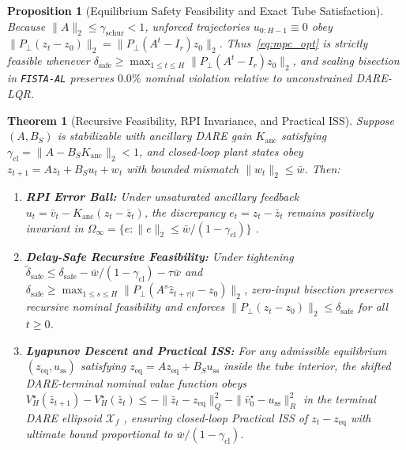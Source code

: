\documentclass[journal]{IEEEtran}
\newtheorem{theorem}{Theorem}
\newtheorem{proposition}{Proposition}
\begin{document}
\begin{proposition}[Equilibrium Safety Feasibility and Exact Tube Satisfaction]
\label{prop:mpc_safe}
Because $\|A\|_2 \le \gamma_{\mathrm{schur}} < 1$, unforced trajectories $u_{0:H-1} \equiv 0$ obey $\|P_\perp(z_t - z_0)\|_2 = \|P_\perp(A^t - I_r)z_0\|_2$. Thus~\eqref{eq:mpc_opt} is strictly feasible whenever $\delta_{\mathrm{safe}} \ge \max_{1\le t \le H}\|P_\perp(A^t - I_r)z_0\|_2$, and scaling bisection in \texttt{FISTA-AL} preserves $0.0\%$ nominal violation relative to unconstrained DARE-LQR.
\end{proposition}

\begin{theorem}[Recursive Feasibility, RPI Invariance, and Practical ISS]
\label{thm:tube_rpi}
Suppose $(A, B_S)$ is stabilizable with ancillary DARE gain $K_{\mathrm{anc}}$ satisfying $\gamma_{\mathrm{cl}} = \|A - B_S K_{\mathrm{anc}}\|_2 < 1$, and closed-loop plant states obey $z_{t+1} = A z_t + B_S u_t + w_t$ with bounded mismatch $\|w_t\|_2 \le \bar{w}$. Then:
\begin{enumerate}
  \item \textbf{RPI Error Ball:} Under unsaturated ancillary feedback $u_t = \bar{v}_t - K_{\mathrm{anc}}(z_t - \bar{z}_t)$, the discrepancy $e_t = z_t - \bar{z}_t$ remains positively invariant in $\Omega_\infty = \{e : \|e\|_2 \le \bar{w}/(1-\gamma_{\mathrm{cl}})\}$ \cite{mayne2005robust}.
  \item \textbf{Delay-Safe Recursive Feasibility:} Under tightening $\tilde{\delta}_{\mathrm{safe}} \le \delta_{\mathrm{safe}} - \bar{w}/(1-\gamma_{\mathrm{cl}}) - \tau\bar{w}$ and $\delta_{\mathrm{safe}} \ge \max_{1\le s\le H}\|P_\perp(A^s\hat{z}_{t+\tau|t} - z_0)\|_2$, zero-input bisection preserves recursive nominal feasibility and enforces $\|P_\perp(z_t - z_0)\|_2 \le \delta_{\mathrm{safe}}$ for all $t \ge 0$.
  \item \textbf{Lyapunov Descent and Practical ISS:} For any admissible equilibrium $(z_{\mathrm{eq}}, u_{\mathrm{ss}})$ satisfying $z_{\mathrm{eq}} = A z_{\mathrm{eq}} + B_S u_{\mathrm{ss}}$ inside the tube interior, the shifted DARE-terminal nominal value function obeys $V_H^\star(\bar{z}_{t+1}) - V_H^\star(\bar{z}_t) \le -\|\bar{z}_t - z_{\mathrm{eq}}\|_Q^2 - \|\bar{v}_0^\star - u_{\mathrm{ss}}\|_R^2$ in the terminal DARE ellipsoid $\mathcal{X}_f$ \cite{mayne2000constrained,rawlings2017model}, ensuring closed-loop Practical ISS of $z_t - z_{\mathrm{eq}}$ with ultimate bound proportional to $\bar{w}/(1-\gamma_{\mathrm{cl}})$.
\end{enumerate}
\end{theorem}
\end{document}
